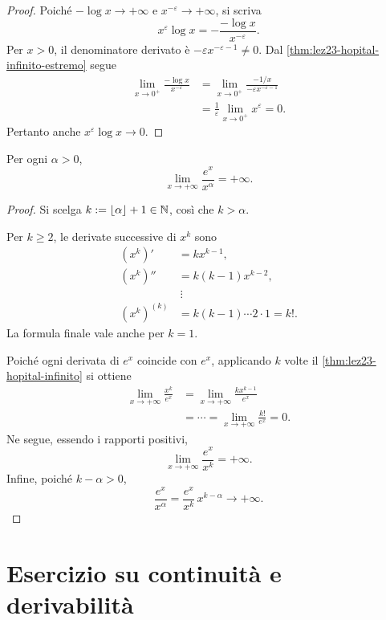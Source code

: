 \begin{proof}
Poiché \(-\log x\to+\infty\) e
\(x^{-\varepsilon}\to+\infty\), si scriva
\[
  x^\varepsilon\log x
  =-\frac{-\log x}{x^{-\varepsilon}}.
\]
Per \(x>0\), il denominatore derivato è
\(-\varepsilon x^{-\varepsilon-1}\ne0\).
Dal \cref{thm:lez23-hopital-infinito-estremo} segue
\[
\begin{aligned}
  \lim_{x\to0^+}\frac{-\log x}{x^{-\varepsilon}}
  &=\lim_{x\to0^+}
    \frac{-1/x}{-\varepsilon x^{-\varepsilon-1}}\\
  &=\frac1\varepsilon\lim_{x\to0^+}x^\varepsilon=0.
\end{aligned}
\]
Pertanto anche \(x^\varepsilon\log x\to0\).
\end{proof}

\begin{proposition}
\label{prop:lez23-esponenziale-potenza}
Per ogni \(\alpha>0\),
\[
  \lim_{x\to+\infty}\frac{e^x}{x^\alpha}=+\infty.
\]
\end{proposition}

\begin{proof}
Si scelga \(k:=\lfloor\alpha\rfloor+1\in\mathbb{N}\),
così che \(k>\alpha\).

Per \(k\ge2\), le derivate successive di \(x^k\)
sono
\[
\begin{aligned}
  (x^k)' &= kx^{k-1},\\
  (x^k)'' &= k(k-1)x^{k-2},\\
  &\ \vdots\\
  (x^k)^{(k)} &= k(k-1)\cdots2\cdot1=k!.
\end{aligned}
\]
La formula finale vale anche per \(k=1\).

Poiché ogni derivata di \(e^x\) coincide con
\(e^x\), applicando \(k\) volte il
\cref{thm:lez23-hopital-infinito} si ottiene
\[
\begin{aligned}
  \lim_{x\to+\infty}\frac{x^k}{e^x}
  &=\lim_{x\to+\infty}\frac{kx^{k-1}}{e^x}\\
  &=\cdots
  =\lim_{x\to+\infty}\frac{k!}{e^x}=0.
\end{aligned}
\]
Ne segue, essendo i rapporti positivi,
\[
  \lim_{x\to+\infty}\frac{e^x}{x^k}=+\infty.
\]
Infine, poiché \(k-\alpha>0\),
\[
  \frac{e^x}{x^\alpha}
  =\frac{e^x}{x^k}\,x^{k-\alpha}
  \longrightarrow+\infty.
\]
\end{proof}

\section{Esercizio su continuità e derivabilità}
\label{sec:lez23-esercizio-tratti}

